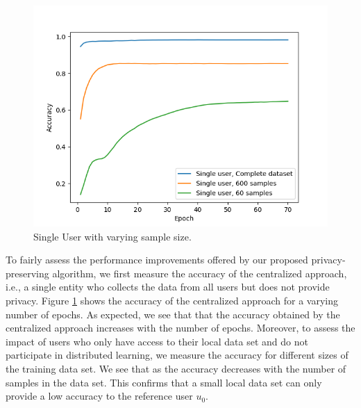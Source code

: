 \documentclass[conference]{IEEEtran}
\begin{document}
\begin{figure}[!h]
\centering
\includegraphics[width=\columnwidth, keepaspectratio]{SingleUserBaselines}
\caption{Single User with varying sample size.}
\label{fig:SingleUser}
\end{figure}
To fairly assess the performance improvements offered by our proposed privacy-preserving algorithm, we first measure the accuracy of
the centralized approach, i.e., a single entity who collects the data from all users but does not provide privacy. 
Figure \ref{fig:SingleUser} shows the accuracy of the centralized approach for a varying number of epochs. As expected, we see that
that the accuracy obtained by the centralized approach increases with the number of epochs. 
Moreover, to assess the impact of users who only have access to their local data set and do not participate in distributed
learning, we measure the accuracy for different sizes of the training data set. We see that as the accuracy decreases with the number
of samples in the data set. This confirms that a small local data set can only provide a low accuracy to the reference user $u_0$.
\end{document}
